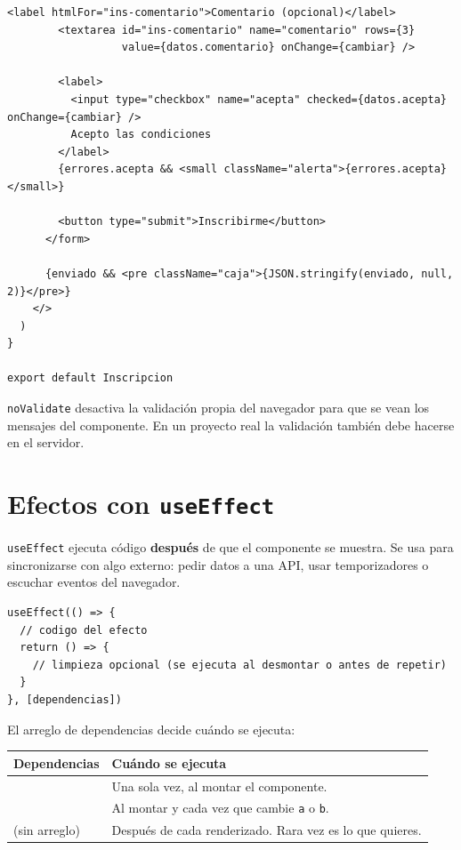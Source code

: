 \documentclass[11pt,a4paper]{article}
\newcommand{\cmd}[1]{\texttt{\color{reactdark}#1}}
\begin{document}
\begin{lstlisting}[language=JSX,title={\small\ttfamily src/components/formularios/Inscripcion.jsx}]
        <label htmlFor="ins-comentario">Comentario (opcional)</label>
        <textarea id="ins-comentario" name="comentario" rows={3}
                  value={datos.comentario} onChange={cambiar} />

        <label>
          <input type="checkbox" name="acepta" checked={datos.acepta} onChange={cambiar} />
          Acepto las condiciones
        </label>
        {errores.acepta && <small className="alerta">{errores.acepta}</small>}

        <button type="submit">Inscribirme</button>
      </form>

      {enviado && <pre className="caja">{JSON.stringify(enviado, null, 2)}</pre>}
    </>
  )
}

export default Inscripcion
\end{lstlisting}

\cmd{noValidate} desactiva la validación propia del navegador para que se vean los mensajes del componente. En un proyecto real la validación también debe hacerse en el servidor.

\section{Efectos con \texttt{useEffect}}

\cmd{useEffect} ejecuta código \textbf{después} de que el componente se muestra. Se usa para sincronizarse con algo externo: pedir datos a una API, usar temporizadores o escuchar eventos del navegador.

\begin{lstlisting}[language=JSX]
useEffect(() => {
  // codigo del efecto
  return () => {
    // limpieza opcional (se ejecuta al desmontar o antes de repetir)
  }
}, [dependencias])
\end{lstlisting}

El arreglo de dependencias decide cuándo se ejecuta:
\begin{center}
\begin{tabular}{>{\ttfamily}l p{9cm}}
\toprule
\textrm{\textbf{Dependencias}} & \textbf{Cuándo se ejecuta} \\
\midrule
{[]} & Una sola vez, al montar el componente. \\
{[a, b]} & Al montar y cada vez que cambie \cmd{a} o \cmd{b}. \\
\textrm{(sin arreglo)} & Después de cada renderizado. Rara vez es lo que quieres. \\
\bottomrule
\end{tabular}
\end{center}
\end{document}
